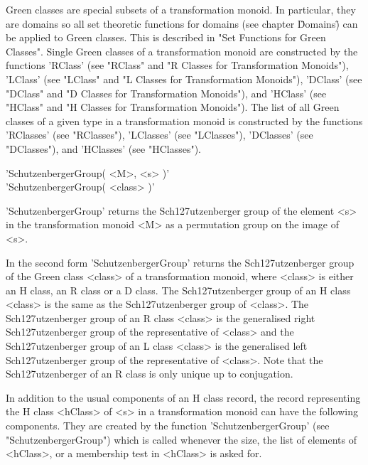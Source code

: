 Green   classes  are special  subsets  of  a   transformation monoid.  In
particular,  they are domains so  all set theoretic functions for domains
(see chapter \"Domains\")   can be applied to   Green classes.  This   is
described in "Set Functions for Green  Classes".  Single Green classes of
a transformation  monoid are constructed by  the  functions 'RClass' (see
"RClass"  and "R   Classes for  Transformation   Monoids"), 'LClass' (see
"LClass" and   "L  Classes for  Transformation   Monoids"), 'DClass' (see
"DClass" and "D Classes  for Transformation Monoids"), and  'HClass' (see
"HClass"  and "H Classes for Transformation  Monoids").   The list of all
Green classes  of a given type  in a transformation monoid is constructed
by    the   functions   'RClasses'  (see    "RClasses"),  'LClasses' (see
"LClasses"),   'DClasses'    (see    "DClasses"),  and   'HClasses'  (see
"HClasses").


'SchutzenbergerGroup( <M>, <s> )'\\
'SchutzenbergerGroup( <class> )'

'SchutzenbergerGroup' returns the  Sch\accent127utzenberger  group of the
element  <s> in the  transformation monoid <M> as  a permutation group on
the image of <s>.

In     the   second    form      'SchutzenbergerGroup'    returns     the
Sch\accent127utzenberger   group  of  the    Green class   <class>   of a
transformation monoid, where <class> is either an H  class, an R class or
a D class.  The  Sch\accent127utzenberger group of an  H class <class> is
the  same  as   the  Sch\accent127utzenberger  group  of   <class>.   The
Sch\accent127utzenberger group of  an R class  <class> is the generalised
right Sch\accent127utzenberger group of the representative of <class> and
the  Sch\accent127utzenberger  group  of an    L  class  <class> is   the
generalised left Sch\accent127utzenberger group  of the representative of
<class>.  Note  that the Sch\accent127utzenberger of  an R  class is only
unique up to conjugation.


In addition to  the usual components of   an H class record,  the  record
representing the H class  <hClass> of <s>  in a transformation monoid can
have the  following  components.     They are created  by   the  function
'SchutzenbergerGroup'   (see  "SchutzenbergerGroup")    which is   called
whenever the size, the list of elements of <hClass>, or a membership test
in <hClass> is asked for.

